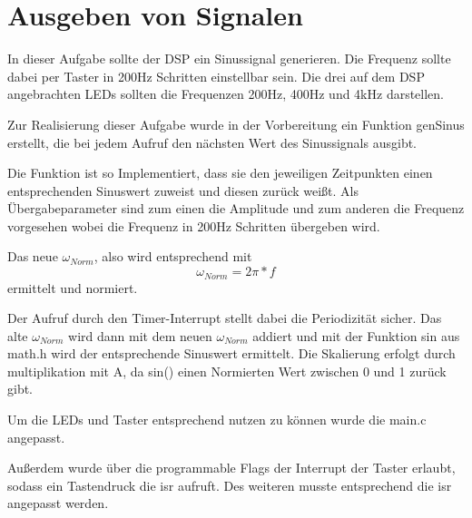 \chapter{Ausgeben von Signalen}
In dieser Aufgabe sollte der DSP ein Sinussignal generieren. Die Frequenz sollte 
dabei per Taster in 200Hz Schritten einstellbar sein. 
Die drei auf dem DSP angebrachten LEDs sollten die Frequenzen 200Hz, 400Hz und 4kHz darstellen.

Zur Realisierung dieser Aufgabe wurde in der Vorbereitung ein Funktion genSinus erstellt, 
die bei jedem Aufruf den nächsten Wert des Sinussignals ausgibt.

\begin{adjustbox}{width=\textwidth,keepaspectratio}

\end{adjustbox}

Die Funktion ist so Implementiert, dass sie den jeweiligen Zeitpunkten einen entsprechenden Sinuswert zuweist und diesen zurück weißt. 
Als \"Ubergabeparameter sind zum einen die Amplitude und zum anderen die Frequenz vorgesehen wobei die Frequenz in 200Hz Schritten \"ubergeben wird. 

Das neue \begin{math}\omega_{Norm}\end{math}, also wird entsprechend mit 
\begin{equation}\label{normierteKreisfrequenz}
 \omega_{Norm}=2\pi*f 
\end{equation}  
ermittelt und normiert.\\\par
Der Aufruf durch den Timer-Interrupt stellt dabei die Periodizität sicher. 
Das alte \begin{math}\omega_{Norm}\end{math} wird dann mit dem neuen \begin{math}\omega_{Norm}\end{math} addiert und mit der Funktion sin aus math.h 
wird der entsprechende Sinuswert ermittelt. Die Skalierung erfolgt durch multiplikation mit A, da sin() einen Normierten Wert zwischen 0 und 1 zurück gibt.

Um die LEDs und Taster entsprechend nutzen zu können wurde die main.c angepasst.
\begin{adjustbox}{width=\textwidth,keepaspectratio}

\end{adjustbox}

Außerdem wurde über die programmable Flags der Interrupt der Taster erlaubt, sodass ein Tastendruck die isr aufruft. 
Des weiteren musste entsprechend die isr angepasst werden.

\begin{adjustbox}{width=\textwidth,keepaspectratio}

\end{adjustbox}
